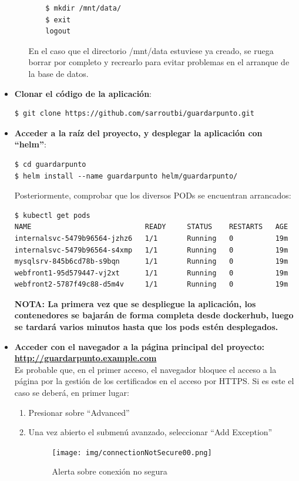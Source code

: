 \documentclass[12pt,spanish]{article}
\begin{document}
\begin{itemize}
\begin{itemize}
\begin{verbatim}
    $ mkdir /mnt/data/
    $ exit
    logout
  \end{verbatim}
  En el caso que el directorio /mnt/data estuviese ya creado, se ruega borrar por completo y recrearlo para evitar problemas en el arranque de la base de datos.
  \end{itemize}
\item{\textbf{Clonar el código de la aplicación}}:
\begin{verbatim}
$ git clone https://github.com/sarroutbi/guardarpunto.git
\end{verbatim}
\item{\textbf{Acceder a la raíz del proyecto, y desplegar la aplicación con ``helm''}}:
\begin{verbatim}
$ cd guardarpunto
$ helm install --name guardarpunto helm/guardarpunto/
\end{verbatim}
Posteriormente, comprobar que los diversos PODs se encuentran arrancados:
\begin{verbatim}
$ kubectl get pods
NAME                           READY     STATUS    RESTARTS   AGE
internalsvc-5479b96564-jzhz6   1/1       Running   0          19m
internalsvc-5479b96564-s4xmp   1/1       Running   0          19m
mysqlsrv-845b6cd78b-s9bqn      1/1       Running   0          19m
webfront1-95d579447-vj2xt      1/1       Running   0          19m
webfront2-5787f49c88-d5m4v     1/1       Running   0          19m
\end{verbatim}
\textbf{NOTA: La primera vez que se despliegue la aplicación, los contenedores se bajarán de forma completa desde dockerhub, luego se tardará varios minutos hasta que los pods estén desplegados.}
\item{\textbf{Acceder con el navegador a la página principal del proyecto:\\
\url{http://guardarpunto.example.com}}}\\
Es probable que, en el primer acceso, el navegador bloquee el acceso a la página por la gestión de los certificados en el acceso por HTTPS. Si es este el caso se deberá, en primer lugar:
\begin{enumerate}
\item{Presionar sobre ``Advanced''}
\item{Una vez abierto el submenú avanzado, seleccionar ``Add Exception''}
\begin{center}
 \begin{figure}[H]
 \begin{center}
   \texttt{[image: img/connectionNotSecure00.png]}
   \caption{Alerta sobre conexión no segura}

\end{center}
\end{figure}
\end{center}
\end{enumerate}
\end{itemize}
\end{document}
